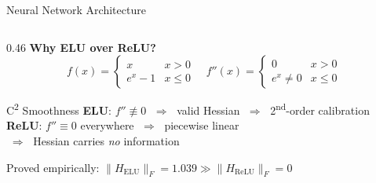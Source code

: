 \documentclass[aspectratio=169, 10pt]{beamer}
\begin{document}
\begin{frame}{Neural Network Architecture}
\begin{columns}[T]
    \begin{column}{0.46\textwidth}
      \textbf{Why ELU over ReLU?}\\[0.4em]
      \[
        f(x)=\begin{cases}x & x>0\\e^x-1 & x\le 0\end{cases}
        \quad
        f''(x)=\begin{cases}0 & x>0\\e^x\neq 0 & x\le 0\end{cases}
      \]
      \vspace{0.3em}
      \begin{alertblock}{C\textsuperscript{2} Smoothness}
        \small
        \textbf{ELU}: $f''\not\equiv 0$
        $\;\Rightarrow\;$ valid Hessian
        $\;\Rightarrow\;$ 2\textsuperscript{nd}-order calibration\\[0.4em]
        \textbf{ReLU}: $f''\equiv 0$ everywhere
        $\;\Rightarrow\;$ piecewise linear\\
        $\;\Rightarrow\;$ Hessian carries \emph{no} information
      \end{alertblock}
      \vspace{0.3em}
      {\small Proved empirically:
        $\|H_\mathrm{ELU}\|_F = 1.039 \gg \|H_\mathrm{ReLU}\|_F = 0$}
    \end{column}
  \end{columns}
\end{frame}
\end{document}
